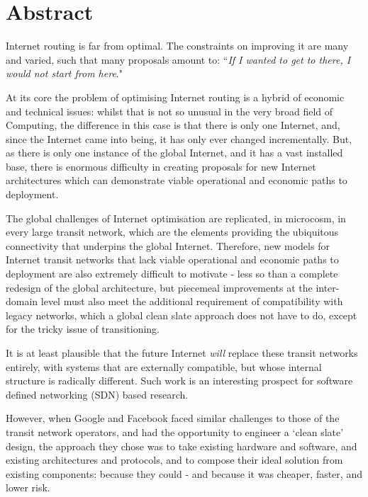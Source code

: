 {\centering \section*{Abstract}}
Internet routing is far from optimal.  The constraints on improving it are many and varied, such that many proposals amount to:
``\emph{If I wanted to get to there, I would not start from here}."


At its core the problem of optimising Internet routing is a hybrid of economic and technical issues: whilst that is not so unusual in the very broad field of Computing, the difference in this case is that there is only one Internet, and, since the Internet came into being, it has only ever changed incrementally.
But, as there is only one instance of the global Internet, and it has a vast installed base, there is enormous difficulty in creating proposals for new Internet architectures which can demonstrate viable operational and economic paths to deployment.

The global challenges of Internet optimisation are replicated, in microcosm, in every large transit network,
which are the elements providing the ubiquitous connectivity that underpins the global Internet.
Therefore, new models for Internet transit networks that lack viable operational and economic paths to deployment are also extremely difficult to motivate - less so than a complete redesign of the global architecture, but piecemeal improvements at the inter-domain level must also meet the additional requirement of compatibility with legacy networks, which a global clean slate approach does not have to do, except for the tricky issue of transitioning.

It is at least plausible that the future Internet \emph{will} replace these transit networks entirely, with systems that are externally compatible, but whose internal structure is radically different.
Such work is an interesting prospect for software defined networking (SDN) based research.

However, when Google and Facebook faced similar challenges to those of the transit network operators, and had the opportunity to engineer a `clean slate' design, the approach they chose was to take existing hardware and software, and existing architectures and protocols, and to compose their ideal solution from existing components: because they could - and because it was cheaper, faster, and lower risk.

